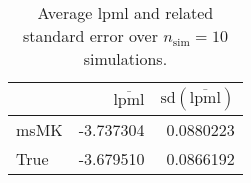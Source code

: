 \begin{table}[H]

\caption{Average lpml and related standard error over $n_{\text{sim}} = 10$ simulations.}
\centering
\begin{tabular}[t]{lrr}
\toprule
  & $\overbar{\text{lpml}}$ & $\text{sd}(\overbar{\text{lpml}})$\\
\midrule
msMK & -3.737304 & 0.0880223\\
True & -3.679510 & 0.0866192\\
\bottomrule
\end{tabular}
\end{table}